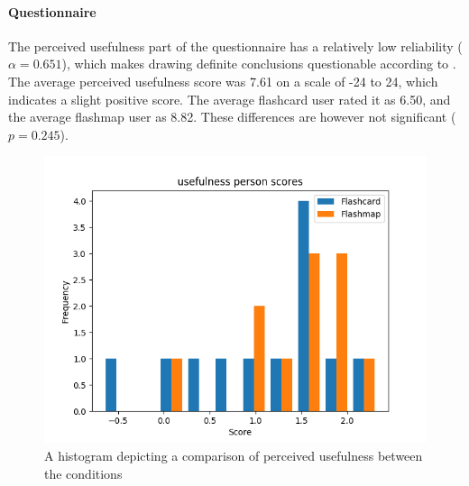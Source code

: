 \paragraph{Questionnaire} The perceived usefulness part of the questionnaire has a relatively low reliability ($\alpha=0.651$), which makes drawing definite conclusions questionable according to . The average perceived usefulness score was 7.61 on a scale of -24 to 24, which indicates a slight positive score. The average flashcard user rated it as 6.50, and the average flashmap user as 8.82. These differences are however not significant ($p=0.245$).

\begin{figure}
    \centering
    \includegraphics[width=.7\textwidth]{img/usefulness_abil.png}
    \caption{A histogram depicting a comparison of perceived usefulness between the conditions}
    \label{fig:usefulness_abil}
\end{figure}

